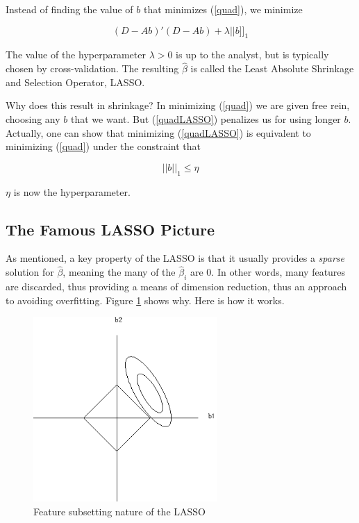 Instead of finding the value of $b$ that minimizes (\ref{quad}), we
minimize

\begin{equation}
\label{quadLASSO}
(D - Ab)'(D - Ab) + \lambda ||b]]_{1}
\end{equation}

The value of the hyperparameter $\lambda > 0$ is up to the analyst, but
is typically chosen by cross-validation.  The resulting $\widehat{\beta}$
is called the Least Absolute Shrinkage and Selection Operator, LASSO.

Why does this result in shrinkage?  In minimizing (\ref{quad}) we are
given free rein, choosing any $b$ that we want.  But (\ref{quadLASSO})
penalizes us for using longer $b$.  Actually, one can show that
minimizing (\ref{quadLASSO}) is equivalent to minimizing (\ref{quad})
under the constraint that 

\begin{equation}
\label{dual}
||b||_{1} \leq \eta
\end{equation}

$\eta$ is now the hyperparameter.

\subsection{The Famous LASSO Picture}

As mentioned, a key property of the LASSO is that it usually provides a
\textit{sparse} solution for $\widehat{\beta}$, meaning the many of the
$\widehat{\beta}_i$ are 0.  In other words, many features are discarded,
thus providing a means of dimension reduction, thus an approach to
avoiding overfitting.  Figure \ref{lassosub} shows why.  Here is how it
works.

\begin{figure}
\vskip 0.2in
\centerline{
\includegraphics[width=2.75in]{Images/LASSO_gray.png}
}
\caption{Feature subsetting nature of the LASSO}
\label{lassosub}
\end{figure}

